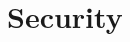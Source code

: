 \documentclass[Main]{subfiles}
\begin{document}
\chapter{Security}\label{cha:Security}

%
%
%
%
\end{document}
